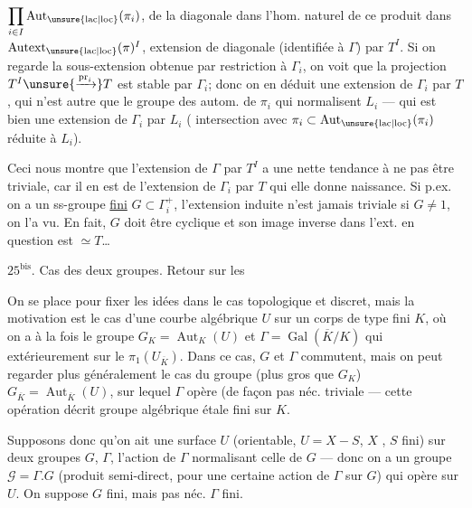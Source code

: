 $\displaystyle\prod_{i\in I}\operatorname{Aut}_{\unsure{\mathrm{lac}|\mathrm{loc}}}(\pi_i)$,
  de la diagonale
dans l'hom. naturel de ce produit dans
$\operatorname{Autext}_{\unsure{\mathrm{lac}|\mathrm{loc}}}(\pi)^I$,   extension de
 diagonale (identifiée à $\Gamma$) par $T^I$.
Si on regarde la sous-extension  obtenue
par restriction à $\Gamma_i$, on voit que la
projection $T^I\unsure{\xrightarrow{\mathrm{pr}_i}}T$ est stable par $\Gamma_i$; donc
on en déduit une extension de $\Gamma_i$ par $T$,
qui n'est autre que le groupe des
autom.  de $\pi_i$ qui normalisent $L_i$
--- qui est bien une extension de $\Gamma_i$ par $L_i$
( intersection avec $\pi_i\subset\operatorname{Aut}_{\unsure{\mathrm{lac}|\mathrm{loc}}}(\pi_i)$ 
réduite à $L_i$).

Ceci nous montre que l'extension
de $\Gamma$ par $T^I$ a une nette tendance à
ne pas être triviale, car il en est 
 de l'extension de $\Gamma_i$ par $T$  qui elle donne
naissance. Si p.ex. on a un ss-groupe
\uline{fini} $G\subset\Gamma_i^+$, l'extension induite n'est
jamais triviale si $G\ne1$, on l'a vu. En
fait, $G$ doit être cyclique et son image inverse
dans l'ext. en question est $\simeq T$\ldots
{}

$25^{\mathrm{bis}}$. Cas des deux groupes. Retour sur les 

On se place  pour fixer les idées dans le cas
topologique et discret, mais la motivation est
le cas d'une courbe algébrique $U$ sur un
corps de type fini $K$, où on a à la fois
le groupe $G_K=\operatorname{Aut}_K(U)$ et $\Gamma=\operatorname{Gal}(\overline K/K)$
qui  extérieurement sur le $\pi_1(U_{\overline K})$.
Dans ce cas, $G$ et $\Gamma$ commutent, mais
on peut regarder plus généralement le cas
du groupe (plus gros que $G_K$) $G_{\overline K}=\operatorname{Aut}_{\overline K}(U)$,
sur lequel $\Gamma$ opère (de façon pas néc. triviale
--- cette opération décrit  groupe algébrique
étale fini sur $K$.

Supposons donc qu'on ait une surface
$U$ (orientable, $U=X-S$, $X$  , $S$ fini)
sur   deux groupes $G$, $\Gamma$,
l'action de $\Gamma$ normalisant celle de $G$
--- donc on a un groupe $\mathcal G=\Gamma . G$ (produit
semi-direct, pour une certaine action de $\Gamma$
sur $G$) qui opère sur $U$. On suppose $G$
fini, mais pas néc. $\Gamma$ fini.

